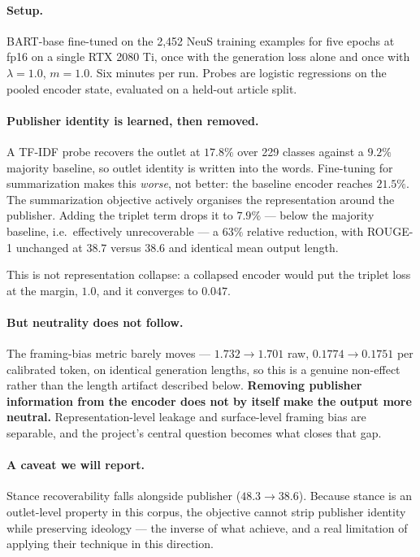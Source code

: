 \documentclass[10pt,twocolumn,a4paper]{article}
\begin{document}
\paragraph{Setup.} BART-base fine-tuned on the 2{,}452 NeuS training examples for
five epochs at fp16 on a single RTX 2080 Ti, once with the generation loss alone
and once with $\lambda=1.0$, $m=1.0$. Six minutes per run. Probes are logistic
regressions on the pooled encoder state, evaluated on a held-out article split.

\paragraph{Publisher identity is learned, then removed.} A TF-IDF probe recovers
the outlet at $17.8\%$ over 229 classes against a $9.2\%$ majority baseline, so
outlet identity is written into the words. Fine-tuning for summarization makes
this \emph{worse}, not better: the baseline encoder reaches $21.5\%$. The
summarization objective actively organises the representation around the
publisher. Adding the triplet term drops it to $7.9\%$ --- below the majority
baseline, i.e.\ effectively unrecoverable --- a $63\%$ relative reduction, with
ROUGE-1 unchanged at $38.7$ versus $38.6$ and identical mean output length.

This is not representation collapse: a collapsed encoder would put the triplet
loss at the margin, $1.0$, and it converges to $0.047$.

\paragraph{But neutrality does not follow.} The framing-bias metric barely moves
--- $1.732 \rightarrow 1.701$ raw, $0.1774 \rightarrow 0.1751$ per calibrated
token, on identical generation lengths, so this is a genuine non-effect rather
than the length artifact described below. \textbf{Removing publisher information
from the encoder does not by itself make the output more neutral.}
Representation-level leakage and surface-level framing bias are separable, and
the project's central question becomes what closes that gap.

\paragraph{A caveat we will report.} Stance recoverability falls alongside
publisher ($48.3 \rightarrow 38.6$). Because stance is an outlet-level property
in this corpus, the objective cannot strip publisher identity while preserving
ideology --- the inverse of what \citet{baly2020detect} achieve, and a real
limitation of applying their technique in this direction.
\end{document}
